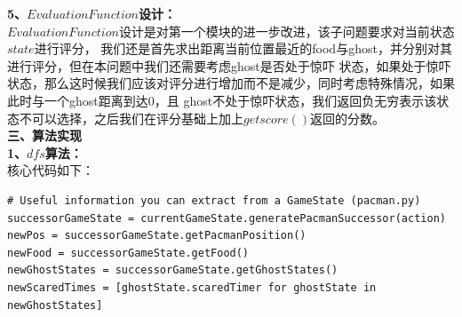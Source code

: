 \documentclass[a4paper,12pt,UTF8]{article}
\begin{document}
\begin{flushleft}
{{    }
    \large{
        \hspace{1cm}\textbf{5、$Evaluation Function$设计：\\}
    }
    \normalsize{
        \hspace{1cm}$Evaluation Function$设计是对第一个模块的进一步改进，该子问题要求对当前状态$state$进行评分，
        我们还是首先求出距离当前位置最近的food与ghost，并分别对其进行评分，但在本问题中我们还需要考虑ghost是否处于惊吓
        状态，如果处于惊吓状态，那么这时候我们应该对评分进行增加而不是减少，同时考虑特殊情况，如果此时与一个ghost距离到达0，且
        ghost不处于惊吓状态，我们返回负无穷表示该状态不可以选择，之后我们在评分基础上加上$getscore()$返回的分数。\\
    }
    \Large{
        \textbf{
            三、算法实现\\
        }
    }
    \large{
        \hspace{1cm}\textbf{1、$dfs$算法：\\}
    }
    \normalsize{
        \hspace{1cm}核心代码如下：\\
    }
    \scriptsize{
        \begin{lstlisting}
# Useful information you can extract from a GameState (pacman.py)
successorGameState = currentGameState.generatePacmanSuccessor(action)
newPos = successorGameState.getPacmanPosition()
newFood = successorGameState.getFood()
newGhostStates = successorGameState.getGhostStates()
newScaredTimes = [ghostState.scaredTimer for ghostState in newGhostStates]


\end{lstlisting}}}
\end{flushleft}
\end{document}
